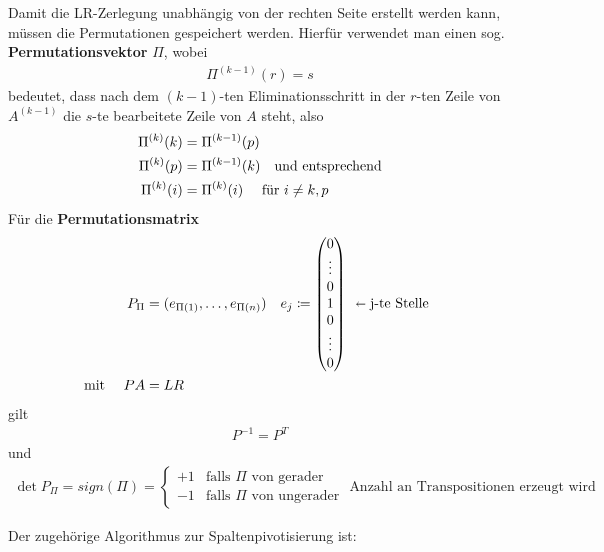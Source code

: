 Damit die LR-Zerlegung unabhängig von der rechten Seite erstellt werden kann, müssen die Permutationen gespeichert werden.
Hierfür verwendet man  einen sog. \textbf{Permutationsvektor} $\Pi$, wobei
\begin{gather*}
  \Pi^{(k-1)}(r) = s
\end{gather*}
bedeutet, dass nach dem $(k-1)$-ten Eliminationsschritt in der $r$-ten Zeile
von $A^{(k-1)}$ die $s$-te bearbeitete Zeile von $A$ steht, also
\begin{align*}
  \Pi^{(k)}(k) &= \Pi^{(k-1)}(p) \\
  \Pi^{(k)}(p) &= \Pi^{(k-1)}(k)  \quad \text{und entsprechend} \\
  \scriptsize \Pi^{(k)} (i) &= \Pi^{(k)} (i) \quad \text{ für }  i\neq k,p 
\end{align*}
Für die \textbf{Permutationsmatrix}  
\begin{align*}
  P_{\Pi}&=(e_{\Pi(1)}, \dots , e_{\Pi(n)}) 
  &&
     e_j\coloneqq \begin{pmatrix}
       0\\\vdots\\0\\
       1 \\
       0\\\vdots\\0 
     \end{pmatrix}
  \begin{array}{l}
    \\\\
    \shortleftarrow \text{j-te Stelle}\\
    \\\\
  \end{array} \\
  \text{mit }	\quad PA&= LR
\end{align*}
gilt
\begin{gather*}
  P^{-1} = P^T
\end{gather*}
und
\begin{gather*}
  \det P_{\Pi} = sign(\Pi) =  \begin{cases}
    +1&  \text{falls }\Pi \text{ von gerader}\\
    -1 &  \text{falls } \Pi \text{ von ungerader}
  \end{cases} \text{ Anzahl an Transpositionen erzeugt wird}
\end{gather*}


\label{2.2.3}
Der zugehörige Algorithmus zur Spaltenpivotisierung ist: \\

